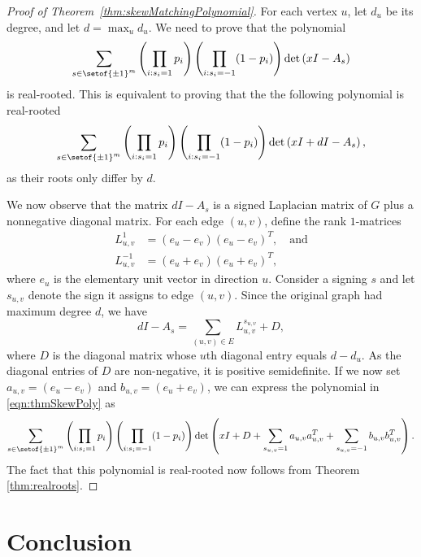 \documentclass[11pt]{article}
\newcommand{\mydet}[1]{\det\left(#1\right)}
\begin{document}
\begin{proof}[Proof of Theorem~\ref{thm:skewMatchingPolynomial}]
For each vertex $u$, let $d_{u}$ be its degree, and
  let $d = \max_{u} d_{u}$.
We need to prove that the polynomial
\[
  \sum_{s \in \setof{\pm 1}^{m}} 
  \left(\prod_{i : s_{i} = 1} p_{i} \right)
  \left(\prod_{i : s_{i} = -1} (1 - p_{i}) \right) 
\mydet{x I - A_{s}}
\]
is real-rooted.
This is equivalent to proving that the the following
  polynomial is real-rooted
\begin{equation}\label{eqn:thmSkewPoly}
  \sum_{s \in \setof{\pm 1}^{m}} 
  \left(\prod_{i : s_{i} = 1} p_{i} \right)
  \left(\prod_{i : s_{i} = -1} (1 - p_{i}) \right) 
\mydet{x I + d I - A_{s}},
\end{equation}
as their roots only differ by $d$.

We now observe that the matrix $d I - A_{s}$ is a signed
  Laplacian matrix of $G$ plus a nonnegative diagonal matrix.
For each edge $(u,v)$, define the rank $1$-matrices
\begin{align*}
  L^{1}_{u,v} & = (e_{u} - e_{v}) (e_{u} - e_{v})^{T}, \quad  \text{and}\\
  L^{-1}_{u,v} & = (e_{u} + e_{v}) (e_{u} + e_{v})^{T},
\end{align*}
where $e_{u}$ is the elementary unit vector in direction $u$. 
Consider a signing $s$ and let $s_{u,v}$ denote the sign it assigns to edge $(u,v)$.
Since the original graph had maximum degree $d$, we have
\[
  d I - A_{s} = \sum_{(u,v) \in E} L^{{s}_{u,v}}_{u,v} + D,
\]
where $D$ is the diagonal matrix whose $u$th diagonal entry
  equals $d - d_{u}$.
As the diagonal entries of $D$ are non-negative, it is positive semidefinite.
If we now set $a_{u,v} = (e_{u} - e_{v})$
  and $b_{u,v} = (e_{u} + e_{v})$,
  we can express 
  the polynomial in \eqref{eqn:thmSkewPoly} as
\begin{multline*}
  \sum_{s \in \setof{\pm 1}^{m}} 
  \left(\prod_{i : s_{i} = 1} p_{i} \right)
  \left(\prod_{i : s_{i} = -1} (1 - p_{i}) \right) 
\mydet{x I + D
  + \sum_{s_{u,v} = 1} a_{u,v} a_{u,v}^{T} 
  + \sum_{s_{u,v} = -1} b_{u,v} b_{u,v}^{T}  
}.
\end{multline*}
The fact that this polynomial is real-rooted now follows from Theorem
  \ref{thm:realroots}.
\end{proof}


\section{Conclusion}
\end{document}
